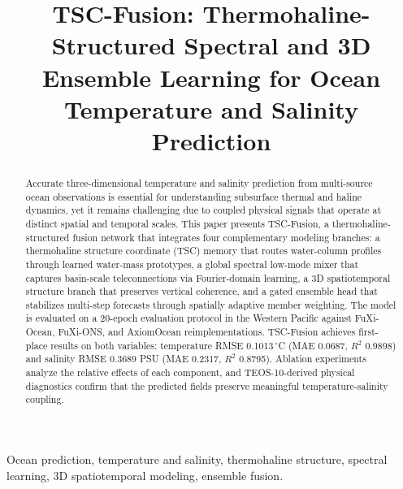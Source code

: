 \documentclass[conference]{IEEEtran}
\begin{document}
\title{TSC-Fusion: Thermohaline-Structured Spectral and 3D Ensemble Learning for Ocean Temperature and Salinity Prediction}

\author{
}

\maketitle

\begin{abstract}
Accurate three-dimensional temperature and salinity prediction from multi-source ocean observations is essential for understanding subsurface thermal and haline dynamics, yet it remains challenging due to coupled physical signals that operate at distinct spatial and temporal scales. This paper presents TSC-Fusion, a thermohaline-structured fusion network that integrates four complementary modeling branches: a thermohaline structure coordinate (TSC) memory that routes water-column profiles through learned water-mass prototypes, a global spectral low-mode mixer that captures basin-scale teleconnections via Fourier-domain learning, a 3D spatiotemporal structure branch that preserves vertical coherence, and a gated ensemble head that stabilizes multi-step forecasts through spatially adaptive member weighting. The model is evaluated on a 20-epoch evaluation protocol in the Western Pacific against FuXi-Ocean, FuXi-ONS, and AxiomOcean reimplementations. TSC-Fusion achieves first-place results on both variables: temperature RMSE 0.1013\,$^\circ$C (MAE 0.0687, $R^2$ 0.9898) and salinity RMSE 0.3689 PSU (MAE 0.2317, $R^2$ 0.8795). Ablation experiments analyze the relative effects of each component, and TEOS-10-derived physical diagnostics confirm that the predicted fields preserve meaningful temperature-salinity coupling.
\end{abstract}

\begin{IEEEkeywords}
Ocean prediction, temperature and salinity, thermohaline structure, spectral learning, 3D spatiotemporal modeling, ensemble fusion.
\end{IEEEkeywords}
\end{document}
